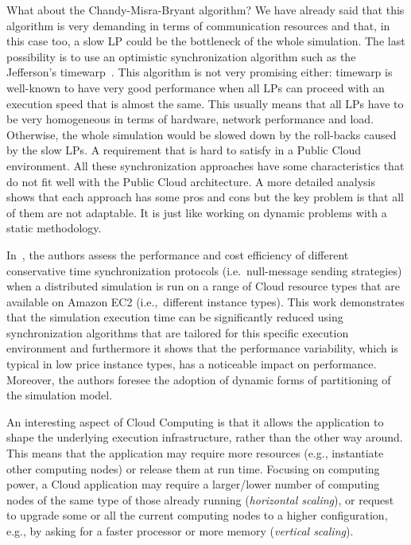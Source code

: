\documentclass[1p]{elsarticle}
\begin{document}
What about the Chandy-Misra-Bryant algorithm? We have already said that 
this algorithm is very demanding in terms of communication resources and 
that, in this case too, a slow LP could be the bottleneck of the whole 
simulation. The last possibility is to use an optimistic synchronization 
algorithm such as the Jefferson's timewarp~\cite{timewarp}. This algorithm 
is not very promising either: timewarp is well-known to have very good 
performance when all LPs can proceed with an execution speed that is 
almost the same. This usually means that all LPs have to be very 
homogeneous in terms of hardware, network performance and load. 
Otherwise, the whole simulation would be slowed down by the 
roll-backs caused by the slow LPs. A requirement that is hard to satisfy 
in a Public Cloud environment. All these synchronization approaches 
have some characteristics that do not fit well with the Public 
Cloud architecture. A more detailed analysis shows that each approach 
has some pros and cons but the key problem is that all of them are 
not adaptable. It is just like working on dynamic problems with a 
static methodology.

In~\cite{Vanmechelen2013126}, the authors assess the performance and 
cost efficiency of different conservative time synchronization protocols 
(i.e.~null-message sending strategies) when a distributed simulation 
is run on a range of Cloud resource types that are available on Amazon 
EC2 (i.e.,~different instance types). This work demonstrates that the 
simulation execution time can be significantly reduced using 
synchronization algorithms that are tailored for this specific 
execution environment and furthermore it shows that the performance 
variability, which is typical in low price instance types, has a 
noticeable impact on performance. Moreover, the authors foresee 
the adoption of dynamic forms of partitioning of the simulation 
model.

An interesting aspect of Cloud Computing is that it allows the
application to shape the underlying execution infrastructure, rather
than the other way around. This means that the application may require
more resources (e.g., instantiate other computing nodes) or release
them at run time. Focusing on computing power, a Cloud application may
require a larger/lower number of computing nodes of the same type of
those already running (\emph{horizontal scaling}), or request to
upgrade some or all the current computing nodes to a higher
configuration, e.g., by asking for a faster processor or more memory
(\emph{vertical scaling}).
\end{document}
